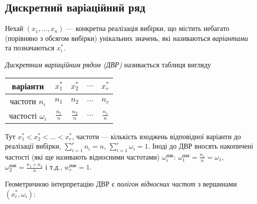 \subsection{Дискретний варіаційний ряд}
Нехай $\left(x_1, ... ,x_n\right)$ --- конкретна реалізація вибірки, що містить небагато (порівняно з обсягом вибірки) унікальних значень,
які називаються \emph{варіантами} та позначаються $x_i^*$.
\begin{definition}
    \emph{Дискретним варіаційним рядом (ДВР)} називається таблиця вигляду
    \begin{center}
    \begin{tabular}{|c|c|c|c|c|}
        \hline
        варіанти & $x_1^*$ & $x_2^*$ & $...$ & $x_r^*$ \\
        \hline
        частоти $n_i$ & $n_1$ & $n_2$ & $...$ & $n_r$ \\
        \hline
        частості $\omega_i $& $\frac{n_1}{n}$ & $\frac{n_2}{n}$ & $...$ & $\frac{n_r}{n}$ \\
        \hline
    \end{tabular}
    \end{center}
    Тут $x_1^* < x_2^* < ... < x_r^*$, частоти --- кількість входжень відповідної варіанти до реалізації вибірки, $\sum\limits_{i=1}^r n_i = n$, $\sum\limits_{i=1}^r \omega_i = 1$.
    Іноді до ДВР вносять накопичені частості (які ще називають відносними частотами) $\omega_i^{\text{нак}}$: $\omega_1^{\text{нак}} = \frac{n_1}{n} = \omega_1$, $\omega_2^{\text{нак}} = \frac{n_1+n_2}{n}$ і т.д., $w_r^{\text{нак}} = 1$.
\end{definition}
Геометричною інтерпретацію ДВР є \emph{полігон відносних частот} з вершинами $\left( x_i^*, \omega_i\right)$:
